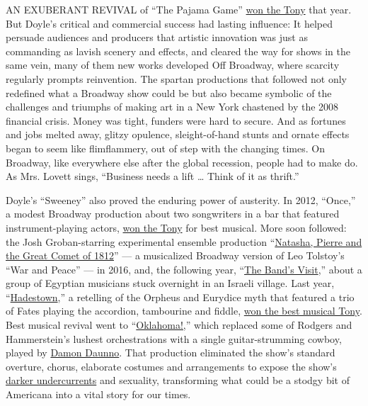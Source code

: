 AN EXUBERANT REVIVAL of ``The Pajama Game''
\href{https://www.nytimes.com/2006/06/12/theater/theaterspecial/12tony.html}{won
the Tony} that year. But Doyle's critical and commercial success had
lasting influence: It helped persuade audiences and producers that
artistic innovation was just as commanding as lavish scenery and
effects, and cleared the way for shows in the same vein, many of them
new works developed Off Broadway, where scarcity regularly prompts
reinvention. The spartan productions that followed not only redefined
what a Broadway show could be but also became symbolic of the challenges
and triumphs of making art in a New York chastened by the 2008 financial
crisis. Money was tight, funders were hard to secure. And as fortunes
and jobs melted away, glitzy opulence, sleight-of-hand stunts and ornate
effects began to seem like flimflammery, out of step with the changing
times. On Broadway, like everywhere else after the global recession,
people had to make do. As Mrs. Lovett sings, ``Business needs a lift
\ldots{} Think of it as thrift.''

Doyle's ``Sweeney'' also proved the enduring power of austerity. In
2012, ``Once,'' a modest Broadway production about two songwriters in a
bar that featured instrument-playing actors,
\href{https://www.nytimes.com/2012/06/11/theater/theaterspecial/musical-once-receives-8-tony-awards.html}{won
the Tony} for best musical. More soon followed: the Josh Groban-starring
experimental ensemble production
``\href{https://www.nytimes.com/2017/05/02/theater/tony-awards-nominations.html}{Natasha,
Pierre and the Great Comet of 1812}'' --- a musicalized Broadway version
of Leo Tolstoy's ``War and Peace'' --- in 2016, and, the following year,
``\href{https://www.nytimes.com/2018/06/10/theater/tony-awards-live.html}{The
Band's Visit},'' about a group of Egyptian musicians stuck overnight in
an Israeli village. Last year,
``\href{https://www.nytimes.com/2019/03/27/theater/rachel-chavkin-hadestown-great-comet.html}{Hadestown},''
a retelling of the Orpheus and Eurydice myth that featured a trio of
Fates playing the accordion, tambourine and fiddle,
\href{https://www.nytimes.com/2019/06/09/theater/tony-awards.html\#link-21590072}{won
the best musical Tony}. Best musical revival went to
``\href{https://www.nytimes.com/2018/12/11/theater/oklahoma-broadway-musical-revival.html}{Oklahoma!,}''
which replaced some of Rodgers and Hammerstein's lushest orchestrations
with a single guitar-strumming cowboy, played by
\href{https://www.nytimes.com/2019/02/22/theater/hadestown-oklahoma-amber-gray-damon-daunno.html}{Damon
Daunno}. That production eliminated the show's standard overture,
chorus, elaborate costumes and arrangements to expose the show's
\href{https://www.nytimes.com/2020/01/20/theater/patrick-vaill-oklahoma-broadway.html}{darker
undercurrents} and sexuality, transforming what could be a stodgy bit of
Americana into a vital story for our times.


